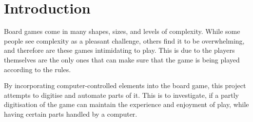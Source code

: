 \chapter{Introduction}\label{ch:introduction}

Board games come in many shapes, sizes, and levels of complexity. While some people see complexity as a pleasant challenge, others find it to be overwhelming, and therefore are these games intimidating to play. This is due to the players themselves are the only ones that can make sure that the game is being played according to the rules.

By incorporating computer-controlled elements into the board game, this project attempts to digitise and automate parts of it. This is to investigate, if a partly digitisation of the game can maintain the experience and enjoyment of play, while having certain parts handled by a computer.


